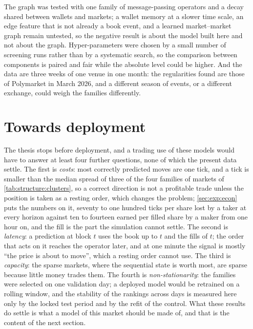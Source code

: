 The graph was tested with one family of message-passing operators and a decay shared
between wallets and markets; a wallet memory at a slower time scale, an edge feature that is
not already a book event, and a learned market--market graph remain untested, so the
negative result is about the model built here and not about the graph.  Hyper-parameters
were chosen by a small number of screening runs rather than by a systematic search, so the
comparison between components is paired and fair while the absolute level could be higher.
And the data are three weeks of one venue in one month: the regularities found are those of
Polymarket in March 2026, and a different season of events, or a different exchange, could
weigh the families differently.

\section{Towards deployment}
\label{sec:concl:deployment}

The thesis stops before deployment, and a trading use of these models would have to answer
at least four further questions, none of which the present data settle.  The first is
\emph{costs}: most correctly predicted moves are one tick, and a tick is smaller than the
median spread of three of the four families of markets of \cref{tab:structure:clusters}, so a
correct direction is not a profitable trade unless the position is taken as a resting order,
which changes the problem; \cref{sec:exp:econ} puts the numbers on it, seventy to one hundred
ticks per share lost by a taker at every horizon against ten to fourteen earned per filled
share by a maker from one hour on, and the fill is the part the simulation cannot settle.  The second is \emph{latency}: a prediction at block $t$ uses the
book up to $t$ and the fills of $t$; the order that acts on it reaches the operator later,
and at one minute the signal is mostly ``the price is about to move'', which a resting order
cannot use.  The third is \emph{capacity}: the sparse markets, where the sequential state is
worth most, are sparse because little money trades them.  The fourth is
\emph{non-stationarity}: the families were selected on one validation day; a deployed model
would be retrained on a rolling window, and the stability of the rankings across days is
measured here only by the locked test period and by the refit of the control.  What these
results do settle is what a model of this market should be made of, and that is the content
of the next section.

